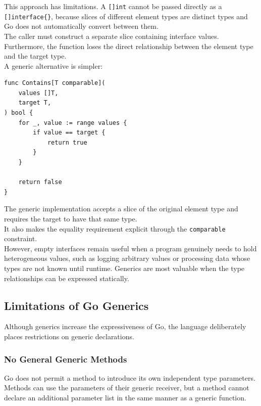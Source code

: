 This approach has limitations. A \texttt{[]int} cannot be passed directly as a \texttt{[]interface\{\}}, because slices of different element types are distinct types and Go does not automatically convert between them.\\

The caller must construct a separate slice containing interface values. Furthermore, the function loses the direct relationship between the element type and the target type.\\

A generic alternative is simpler:

\begin{lstlisting}
func Contains[T comparable](
    values []T,
    target T,
) bool {
    for _, value := range values {
        if value == target {
            return true
        }
    }

    return false
}
\end{lstlisting}

The generic implementation accepts a slice of the original element type and requires the target to have that same type.\\

It also makes the equality requirement explicit through the \texttt{comparable} constraint.\\

However, empty interfaces remain useful when a program genuinely needs to hold heterogeneous values, such as logging arbitrary values or processing data whose types are not known until runtime. Generics are most valuable when the type relationships can be expressed statically.\\

\subsection{Limitations of Go Generics}

Although generics increase the expressiveness of Go, the language deliberately places restrictions on generic declarations.

\subsubsection{No General Generic Methods}

Go does not permit a method to introduce its own independent type parameters. Methods can use the parameters of their generic receiver, but a method cannot declare an additional parameter list in the same manner as a generic function.\\

